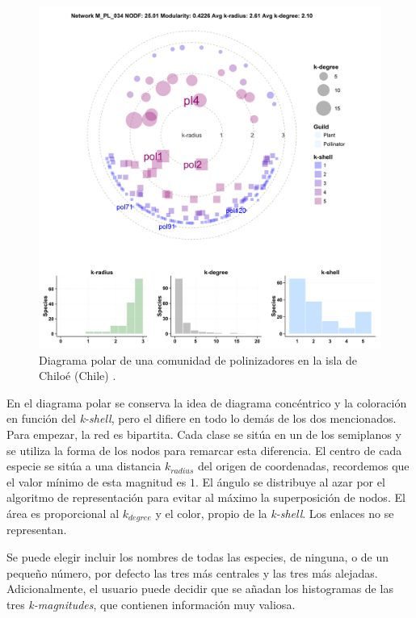 \begin{figure}[h!]
\centering
\includegraphics[scale=0.6]{Figures/VIS_M_PL_034_polar.png}
\caption[PolarExample]{Diagrama polar de una comunidad de polinizadores en la isla de Chiloé (Chile) \cite{smith2005diversity}.}
\label{fig:VIS_M_PL_034_polar}
\end{figure}

En el diagrama polar se conserva la idea de diagrama concéntrico y la coloración en función del \textit{k-shell}, pero el difiere en todo lo demás de los dos mencionados. Para empezar, la red es bipartita. Cada clase se sitúa en un de los semiplanos y se utiliza la forma de los nodos para remarcar esta diferencia. El centro de cada especie se sitúa a una distancia $k_{radius}$ del origen de coordenadas, recordemos que el valor mínimo de esta magnitud es $1$. El ángulo se distribuye al azar por el algoritmo de representación para evitar al máximo la superposición de nodos. El área es proporcional al $k_{degree}$ y el color, propio de la \textit{k-shell}. Los enlaces no se representan.

Se puede elegir incluir los nombres de todas las especies, de ninguna, o de un pequeño número, por defecto las tres más centrales y las tres más alejadas. Adicionalmente, el usuario puede decidir que se añadan los histogramas de las tres \textit{k-magnitudes}, que contienen información muy valiosa.

